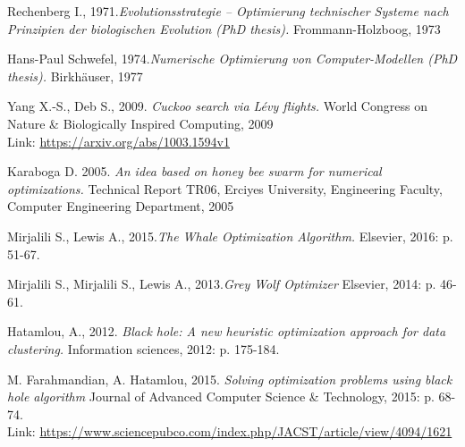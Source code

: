\documentclass[border=0.2cm]{report}
\begin{document}
\begin{thebibliography}{9}

Rechenberg I., 1971.\textit{Evolutionsstrategie – Optimierung technischer Systeme nach Prinzipien der biologischen Evolution (PhD thesis).} Frommann-Holzboog, 1973

Hans-Paul Schwefel, 1974.\textit{Numerische Optimierung von Computer-Modellen (PhD thesis).} Birkhäuser, 1977

Yang X.-S., Deb S., 2009. \textit{Cuckoo search via Lévy flights.} World Congress on Nature \& Biologically Inspired Computing, 2009 \\
Link: \url{https://arxiv.org/abs/1003.1594v1}

Karaboga D. 2005. \textit{An idea based on honey bee swarm for numerical optimizations.} Technical Report TR06, Erciyes University, Engineering Faculty, Computer Engineering Department, 2005

Mirjalili S., Lewis A., 2015.\textit{The Whale Optimization Algorithm.} Elsevier, 2016: p. 51-67.

Mirjalili S., Mirjalili S., Lewis A., 2013.\textit{Grey Wolf Optimizer} Elsevier, 2014: p. 46-61.

Hatamlou, A., 2012. \textit{Black hole: A new heuristic optimization approach for data clustering.} Information sciences, 2012: p. 175-184. 

M. Farahmandian, A. Hatamlou, 2015. \textit{Solving optimization problems using black hole algorithm} Journal of Advanced Computer Science \& Technology, 2015: p. 68-74. \\
Link: \url{https://www.sciencepubco.com/index.php/JACST/article/view/4094/1621}

\end{thebibliography}
\end{document}
